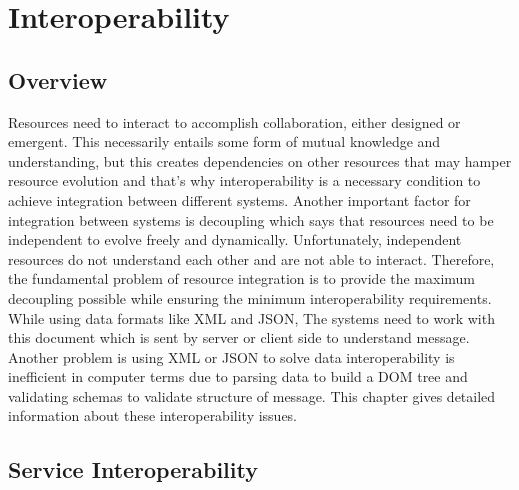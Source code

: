 

\chapter{Interoperability}
\label{chapter:interoperability}
\section{Overview}
\label{section:overview}
Resources need to interact to accomplish collaboration, either designed or emergent. This necessarily entails some form of mutual knowledge and understanding, but this creates dependencies on other resources that may hamper resource evolution and that's why interoperability is a necessary condition to achieve integration between different systems. Another important factor for integration between systems is decoupling which says that resources need to be independent to evolve freely and dynamically. Unfortunately, independent resources do not understand each other and are not able to interact. Therefore, the fundamental problem of resource integration is to provide the maximum decoupling possible while ensuring the minimum interoperability requirements. While using data formats like XML and JSON, The systems need to work with this document which is sent by server or client side to understand message. Another problem is using XML or JSON to solve data interoperability is inefficient in computer terms due to parsing data to build a DOM tree and validating schemas to validate structure of message. This chapter gives detailed information about these interoperability issues.

\section{Service Interoperability}
\label{section:InteroperabilityService}

